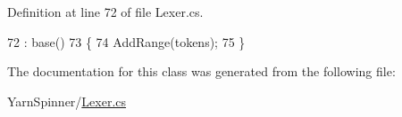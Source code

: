 Definition at line 72 of file Lexer.\-cs.


\begin{DoxyCode}
72                                                  : base()
73         \{
74             AddRange(tokens);
75         \}
\end{DoxyCode}


The documentation for this class was generated from the following file\-:\begin{DoxyCompactItemize}
\item 
Yarn\-Spinner/\hyperlink{a00292}{Lexer.\-cs}\end{DoxyCompactItemize}

